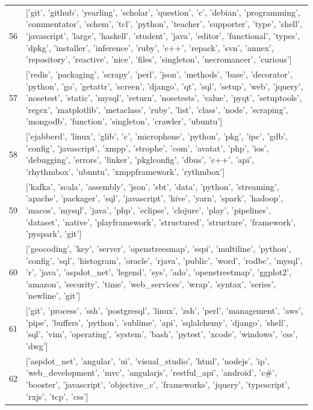 \begin{center}
\begin{longtable}{|p{1.5cm}|p{12.5cm}|}
            56 & ['git', 'github', 'yearling', 'scholar', 'question', 'c', 'debian', 'programming', 'commentator', 'schem', 'tcl', 'python', 'teacher', 'supporter', 'type', 'shell', 'javascript', 'large', 'haskell', 'student', 'java', 'editor', 'functional', 'types', 'dpkg', 'installer', 'inference', 'ruby', 'c++', 'repack', 'svn', 'annex', 'repository', 'reactive', 'nice', 'files', 'singleton', 'necromancer', 'curious']  \\ 
            57 & ['redis', 'packaging', 'scrapy', 'perl', 'json', 'methods', 'base', 'decorator', 'python', 'go', 'getattr', 'screen', 'django', 'qt', 'sql', 'setup', 'web', 'jquery', 'nosetest', 'static', 'mysql', 'return', 'nosetests', 'value', 'pyqt', 'setuptools', 'regex', 'matplotlib', 'metaclass', 'ruby', 'list', 'class', 'node', 'scraping', 'mongodb', 'function', 'singleton', 'crawler', 'ubuntu']  \\ 
            58 & ['ejabberd', 'linux', 'glib', 'c', 'microphone', 'python', 'pkg', 'ipc', 'gdb', 'config', 'javascript', 'xmpp', 'strophe', 'com', 'avatat', 'php', 'ios', 'debugging', 'errors', 'linker', 'pkglconfig', 'dbus', 'c++', 'api', 'rhythmbox', 'ubuntu', 'xmppframework', 'rythmbox']  \\ 
            59 & ['kafka', 'scala', 'assembly', 'json', 'sbt', 'data', 'python', 'streaming', 'apache', 'packager', 'sql', 'javascript', 'hive', 'yarn', 'spark', 'hadoop', 'macos', 'mysql', 'java', 'php', 'eclipse', 'clojure', 'play', 'pipelines', 'dataset', 'native', 'playframework', 'structured', 'structure', 'framework', 'pyspark', 'git']  \\ 
            60 & ['geocoding', 'key', 'server', 'openstreesmap', 'sspi', 'multiline', 'python', 'config', 'sql', 'histogram', 'oracle', 'rjava', 'public', 'word', 'rodbc', 'mysql', 'r', 'java', 'aspdot\_net', 'legend', 'sys', 'ado', 'openstreetmap', 'ggplot2', 'amazon', 'security', 'time', 'web\_services', 'wrap', 'syntax', 'series', 'newline', 'git']  \\ 
            61 & ['git', 'process', 'ssh', 'postgresql', 'linux', 'zsh', 'perl', 'management', 'aws', 'pipe', 'buffers', 'python', 'sublime', 'api', 'sqlalchemy', 'django', 'shell', 'sql', 'vim', 'operating', 'system', 'bash', 'pytest', 'xcode', 'windows', 'css', 'dwg']  \\ 
            62 & ['aspdot\_net', 'angular', 'ui', 'visual\_studio', 'html', 'nodejs', 'ip', 'web\_development', 'mvc', 'angularjs', 'restful\_api', 'android', 'c\#', 'booster', 'javascript', 'objective\_c', 'frameworks', 'jquery', 'typescript', 'rxjs', 'tcp', 'css']  \\ 

\end{longtable}
\end{center}
